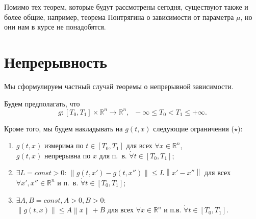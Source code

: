 \documentclass[12pt, a4paper]{article}
\theoremstyle{rusdef}
\newtheorem{theorem}{Теорема}
\newcommand{\R}{\ensuremath{\mathbb{R}}} %
\newcommand{\norm}[1]{\left\lVert #1 \right\rVert} %
\begin{document}
Помимо тех теорем, которые будут рассмотрены сегодня, существуют также и более общие, например, теорема Понтрягина о зависимости от параметра $\mu$, но они нам в курсе не понадобятся.

\section{Непрерывность}
%
%

Мы сформулируем частный случай теоремы о непрерывной зависимости.

Будем предполагать, что
$$
g \colon [T_0, T_1] \times \R^n \to \R^n, \;\; -\infty \leqslant T_0 < T_1 \leqslant +\infty.
$$

Кроме того, мы будем накладывать на $g(t,x)$ следующие ограничения ($\star$):
\begin{enumerate}
\item $g(t,x)$ измерима по $t \in [T_0, T_1]$ для всех $\forall x \in \R^n$,\\
	  $g(t,x)$ непрерывна по $x$ для п.~в. $\dot{\forall} t \in [T_0, T_1]$;
\item $\exists L = const > 0$: $\norm{g(t, x') - g(t, x'')} \leqslant L \norm{x' - x''}$ для всех $\forall x', x'' \in \R^n$ и п.~в. $\dot{\forall} t \in [T_0, T_1]$;
\item $\exists A, B = const, A > 0, B > 0$:\\
	  $\norm{g(t,x)} \leqslant A \norm{x} + B$ для всех $\forall x \in \R^n$ и п.в. $\dot{\forall} t \in [T_0, T_1]$.
\end{enumerate}
\end{document}
